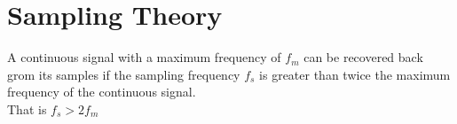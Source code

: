 \documentclass[oneside]{book}
\begin{document}
        \section{Sampling Theory}
                A continuous signal with a maximum frequency of $f_m$ can be recovered 
                back grom its samples if the sampling frequency $f_s$ is greater than
                twice the maximum frequency of the continuous signal.\\
                That is $f_s > 2f_m$\\
            \begin{minipage}{0.45\linewidth}
                \centering
            \end{minipage}
\end{document}
